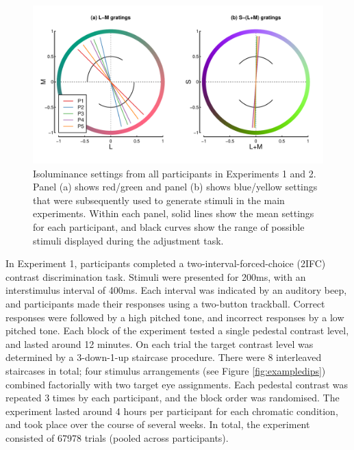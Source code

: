 \documentclass[
]{article}
\begin{document}
\begin{figure}

{\centering \includegraphics{Figures/isosettings} 

}

\caption{Isoluminance settings from all participants in Experiments 1 and 2. Panel (a) shows red/green and panel (b) shows blue/yellow settings that were subsequently used to generate stimuli in the main experiments. Within each panel, solid lines show the mean settings for each participant, and black curves show the range of possible stimuli displayed during the adjustment task.}\label{fig:isofig}
\end{figure}

In Experiment 1, participants completed a two-interval-forced-choice (2IFC) contrast discrimination task. Stimuli were presented for 200ms, with an interstimulus interval of 400ms. Each interval was indicated by an auditory beep, and participants made their responses using a two-button trackball. Correct responses were followed by a high pitched tone, and incorrect responses by a low pitched tone. Each block of the experiment tested a single pedestal contrast level, and lasted around 12 minutes. On each trial the target contrast level was determined by a 3-down-1-up staircase procedure. There were 8 interleaved staircases in total; four stimulus arrangements (see Figure \ref{fig:exampledips}) combined factorially with two target eye assignments. Each pedestal contrast was repeated 3 times by each participant, and the block order was randomised. The experiment lasted around 4 hours per participant for each chromatic condition, and took place over the course of several weeks. In total, the experiment consisted of 67978 trials (pooled across participants).
\end{document}

